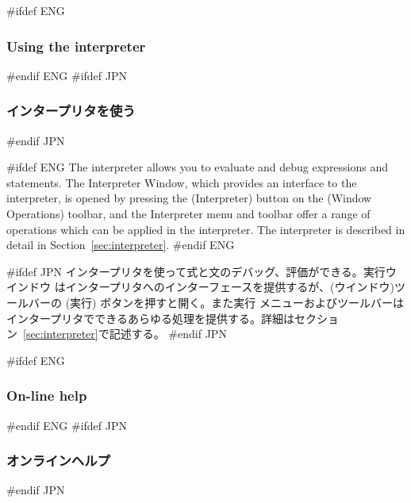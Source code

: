\documentclass[\pformat,12pt]{article}
\newcommand{\Toolbox}{Toolbox}
\newcommand{\Toolbox}{Toolbox}
\newcommand{\guicmd}[1]{{\sf #1}}
\newcommand{\guicmd}[1]{{\gt #1}}
\begin{document}
#ifdef ENG
\subsubsection{Using the interpreter}
#endif ENG
#ifdef JPN
\subsubsection{インタープリタを使う}
#endif JPN

#ifdef ENG
The interpreter allows you to evaluate and debug expressions and
statements. The \guicmd{Interpreter Window}, which provides an
interface to the interpreter, is opened by pressing the 
(\guicmd{Interpreter}) button on the (\guicmd{Window Operations})
toolbar, and the \guicmd{Interpreter} menu and toolbar offer a range
of operations which can be applied in the interpreter. The interpreter
is described in detail in Section~\ref{sec:interpreter}.
#endif ENG

#ifdef JPN
インタープリタを使って式と文のデバッグ、評価ができる。\guicmd{実行ウインドウ}
はインタープリタへのインターフェースを提供するが、(\guicmd{ウインドウ})ツールバーの 
(\guicmd{実行}) ボタンを押すと開く。また\guicmd{実行} メニューおよびツールバーは
インタープリタでできるあらゆる処理を提供する。詳細はセクション~\ref{sec:interpreter}で記述する。
#endif JPN

#ifdef ENG
\subsubsection{On-line help}
#endif ENG
#ifdef JPN
\subsubsection{オンラインヘルプ}
#endif JPN
% 
%
\end{document}
